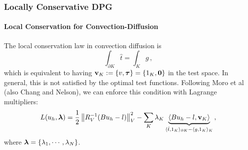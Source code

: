 \documentclass[18pt,xcolor=table]{beamer}
\begin{document}
%                                                                                                                      
%                                                                                                                      
%     
\begin{frame}
\frametitle{Locally Conservative DPG}
\framesubtitle{Local Conservation for Convection-Diffusion}
The local conservation law in convection diffusion is
\[
\int_{\partial K}\hat t=\int_K g\,,
\]
which is equivalent to having $\mathbf{v}_K:=\{v,\boldsymbol\tau\}=\{1_K,\boldsymbol0\}$ in the test space.
In general, this is not satisfied by the optimal test functions.
Following Moro et al (also
Chang and Nelson), we
can enforce this condition with Lagrange multipliers:
\begin{align*}
L(u_h,\boldsymbol\lambda) = \frac{1}{2}\left\| R_V^{-1}(Bu_h-l) \right\|_V^2
-\sum_K\lambda_K\underbrace{\langle Bu_h-l,\mathbf{v}_K\rangle}_
{\langle\hat t, 1_K\rangle_{\partial K}-\langle g,1_K\rangle_K}\,,
\end{align*}
where $\boldsymbol\lambda=\{\lambda_1,\cdots,\lambda_N\}$.
\end{frame}
\end{document}
